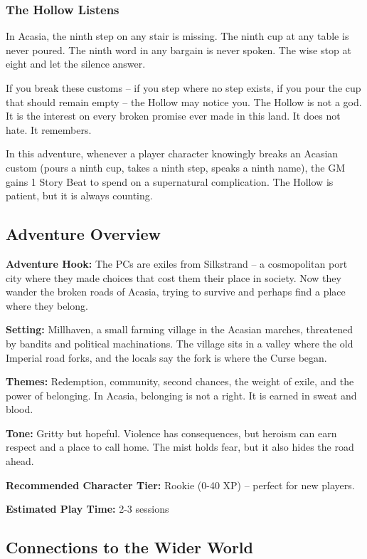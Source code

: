 \documentclass[11pt]{article}
\newenvironment{cursebox}[1]{%
  \begin{mdframed}[backgroundcolor=cursecolor!10, linewidth=1pt, linecolor=cursecolor]%
  \subsubsection*{#1}%
}{%
  \end{mdframed}%
}
\begin{document}
\begin{cursebox}{The Hollow Listens}
In Acasia, the ninth step on any stair is missing. The ninth cup at any table is never poured. The ninth word in any bargain is never spoken. The wise stop at eight and let the silence answer.

If you break these customs -- if you step where no step exists, if you pour the cup that should remain empty -- the Hollow may notice you. The Hollow is not a god. It is the interest on every broken promise ever made in this land. It does not hate. It remembers.

In this adventure, whenever a player character knowingly breaks an Acasian custom (pours a ninth cup, takes a ninth step, speaks a ninth name), the GM gains 1 Story Beat to spend on a supernatural complication. The Hollow is patient, but it is always counting.
\end{cursebox}

\subsection{Adventure Overview}

\textbf{Adventure Hook:} The PCs are exiles from Silkstrand -- a cosmopolitan port city where they made choices that cost them their place in society. Now they wander the broken roads of Acasia, trying to survive and perhaps find a place where they belong.

\textbf{Setting:} Millhaven, a small farming village in the Acasian marches, threatened by bandits and political machinations. The village sits in a valley where the old Imperial road forks, and the locals say the fork is where the Curse began.

\textbf{Themes:} Redemption, community, second chances, the weight of exile, and the power of belonging. In Acasia, belonging is not a right. It is earned in sweat and blood.

\textbf{Tone:} Gritty but hopeful. Violence has consequences, but heroism can earn respect and a place to call home. The mist holds fear, but it also hides the road ahead.

\textbf{Recommended Character Tier:} Rookie (0-40 XP) -- perfect for new players.

\textbf{Estimated Play Time:} 2-3 sessions

\subsection{Connections to the Wider World}
\end{document}
